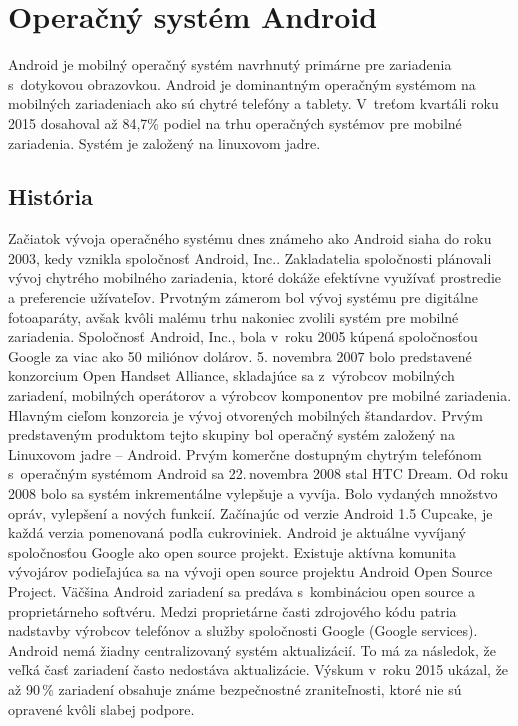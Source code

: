 \chapter{Operačný systém Android}
Android je mobilný operačný systém navrhnutý primárne pre zariadenia s~dotykovou obrazovkou. Android je dominantným operačným systémom na mobilných zariadeniach ako sú chytré telefóny a tablety. V~treťom kvartáli roku 2015 dosahoval až 84,7\% podiel na trhu operačných systémov pre mobilné zariadenia. Systém je založený na linuxovom jadre. 


\section{História}
Začiatok vývoja operačného systému dnes známeho ako Android siaha do roku 2003, kedy vznikla spoločnosť Android, Inc.. Zakladatelia spoločnosti plánovali vývoj chytrého mobilného zariadenia, ktoré dokáže efektívne využívať prostredie a preferencie užívateľov. Prvotným zámerom bol vývoj systému pre digitálne fotoaparáty, avšak kvôli malému trhu nakoniec zvolili systém pre mobilné zariadenia. Spoločnosť Android, Inc., bola v~roku 2005 kúpená spoločnosťou Google za viac ako 50 miliónov dolárov. 5. novembra 2007 bolo predstavené konzorcium Open Handset Alliance, skladajúce sa z~výrobcov mobilných zariadení, mobilných operátorov a výrobcov komponentov pre mobilné zariadenia. Hlavným cieľom konzorcia je vývoj otvorených mobilných štandardov. Prvým predstaveným produktom tejto skupiny bol operačný systém založený na Linuxovom jadre – Android. Prvým komerčne dostupným chytrým telefónom s~operačným systémom Android sa 22.\,novembra 2008 stal HTC Dream. Od roku 2008 bolo sa systém inkrementálne vylepšuje a vyvíja. Bolo vydaných množstvo opráv, vylepšení a nových funkcií. Začínajúc od verzie Android 1.5 Cupcake, je každá verzia pomenovaná podľa cukroviniek.
Android je aktuálne vyvíjaný spoločnosťou Google ako open source projekt. Existuje aktívna komunita vývojárov podieľajúca sa na vývoji open source projektu Android Open Source Project. Väčšina Android zariadení sa predáva s~kombináciou open source a proprietárneho softvéru. Medzi proprietárne časti zdrojového kódu patria nadstavby výrobcov telefónov a služby spoločnosti Google (Google services). Android nemá žiadny centralizovaný systém aktualizácií. To má za následok, že veľká časť zariadení často nedostáva aktualizácie. Výskum v~roku 2015 ukázal, že až 90\,\% zariadení obsahuje známe bezpečnostné zraniteľnosti, ktoré nie sú opravené kvôli slabej podpore.
